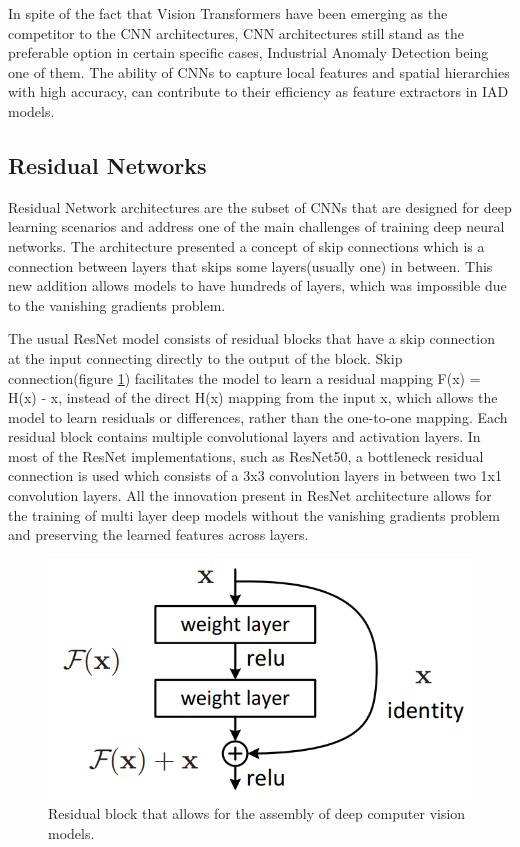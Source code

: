 In spite of the fact that Vision Transformers have been emerging as the competitor to the CNN architectures, CNN architectures still stand as the preferable option in certain specific cases, Industrial Anomaly Detection being one of them. The ability of CNNs to capture local features and spatial hierarchies with high accuracy, can contribute to their efficiency as feature extractors in IAD models.

\subsection{Residual Networks}
\label{resnet}
Residual Network architectures are the subset of CNNs that are designed for deep learning scenarios and address one of the main challenges of training deep neural networks. The architecture presented a concept of skip connections which is a connection between layers that skips some layers(usually one) in between. This new addition allows models to have hundreds of layers, which was impossible due to the vanishing gradients problem.

The usual ResNet model consists of residual blocks that have a skip connection at the input connecting directly to the output of the block. Skip connection(figure \ref{fig:res_block}) facilitates the model to learn a residual mapping F(x) = H(x) - x, instead of the direct H(x) mapping from the input x, which allows the model to learn residuals or differences, rather than the one-to-one mapping. Each residual block contains multiple convolutional layers and activation layers. In most of the ResNet implementations, such as ResNet50, a bottleneck residual connection is used which consists of a 3x3 convolution layers in between two 1x1 convolution layers. All the innovation present in ResNet architecture allows for the training of multi layer deep models without the vanishing gradients problem and preserving the learned features across layers.

\begin{figure}[h]
	\begin{center}
		\includegraphics[width=0.5\linewidth]{Chapter_2/resnet.png}
	\end{center}
	\caption{Residual block that allows for the assembly of deep computer vision models.}
	\label{fig:res_block}
\end{figure}

